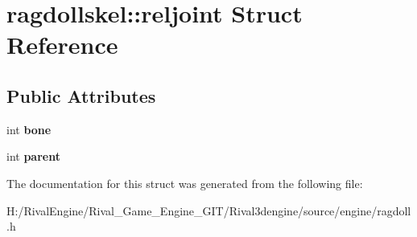 \hypertarget{structragdollskel_1_1reljoint}{}\section{ragdollskel\+:\+:reljoint Struct Reference}
\label{structragdollskel_1_1reljoint}
\subsection*{Public Attributes}
\begin{DoxyCompactItemize}
\item 
\mbox{\label{structragdollskel_1_1reljoint_aa0603879b0ab4931de8b72f9fe235e41}} 
int {\bfseries bone}
\item 
\mbox{\label{structragdollskel_1_1reljoint_a69a42e9f38f0305b7fa9a20edccd61cc}} 
int {\bfseries parent}
\end{DoxyCompactItemize}


The documentation for this struct was generated from the following file\+:\begin{DoxyCompactItemize}
\item 
H\+:/\+Rival\+Engine/\+Rival\+\_\+\+Game\+\_\+\+Engine\+\_\+\+G\+I\+T/\+Rival3dengine/source/engine/ragdoll.\+h\end{DoxyCompactItemize}
